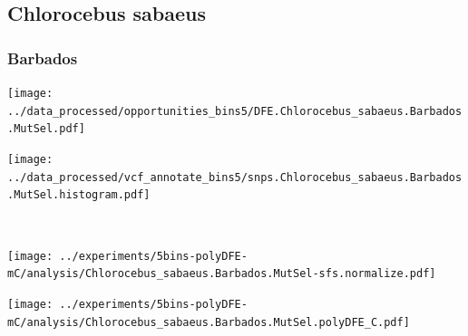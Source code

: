 \subsection{Chlorocebus sabaeus}

\subsubsection{Barbados}

\begin{minipage}{0.49\linewidth}
    \texttt{[image: ../data\_processed/opportunities\_bins5/DFE.Chlorocebus\_sabaeus.Barbados.MutSel.pdf]}
\end{minipage}
\begin{minipage}{0.49\linewidth}
    \texttt{[image: ../data\_processed/vcf\_annotate\_bins5/snps.Chlorocebus\_sabaeus.Barbados.MutSel.histogram.pdf]}
\end{minipage}
\\
\begin{minipage}{0.49\linewidth}
    \texttt{[image: ../experiments/5bins-polyDFE-mC/analysis/Chlorocebus\_sabaeus.Barbados.MutSel-sfs.normalize.pdf]}
\end{minipage}
\begin{minipage}{0.4\linewidth}
    \texttt{[image: ../experiments/5bins-polyDFE-mC/analysis/Chlorocebus\_sabaeus.Barbados.MutSel.polyDFE\_C.pdf]}
\end{minipage}
